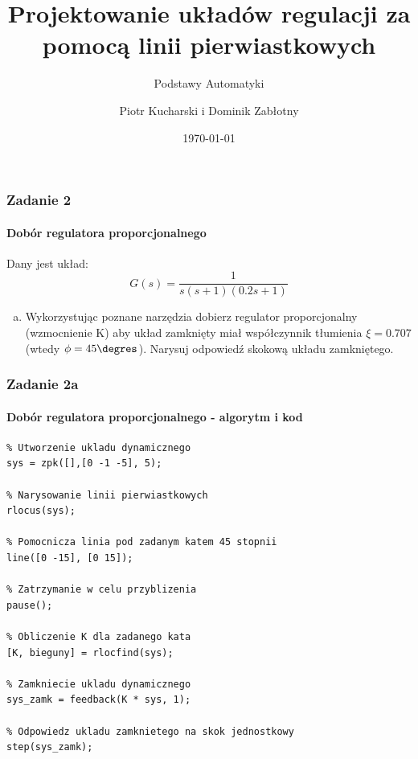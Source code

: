 \documentclass{beamer}
\title{Projektowanie układów regulacji za pomocą linii pierwiastkowych}
\subtitle{Podstawy Automatyki}
\author{Piotr Kucharski i Dominik Zabłotny}
\institute{Wydział Elekrotechniki, Automatyki, Informatyki i Inżynierii Biomedycznej}
\date{\today}
\begin{document}
\titleframe[pl]

\begin{frame}\frametitle{Zadanie 2}\framesubtitle{Dobór regulatora proporcjonalnego}
	Dany jest układ:
	\[
	G(s) = \frac{1}{s(s+1)(0.2s+1)}
	\]
    \begin{enumerate}[a)]
        \item Wykorzystując poznane narzędzia dobierz regulator proporcjonalny (wzmocnienie K) aby układ zamknięty miał współczynnik tłumienia $\xi = 0.707$ (wtedy $\phi = 45\degres$). Narysuj odpowiedź skokową układu zamkniętego.
        
        
    \end{enumerate}
\end{frame}

\begin{frame}[fragile]\frametitle{Zadanie 2a}\framesubtitle{Dobór regulatora proporcjonalnego - algorytm i kod}
	\begin{lstlisting}
% Utworzenie ukladu dynamicznego
sys = zpk([],[0 -1 -5], 5);

% Narysowanie linii pierwiastkowych
rlocus(sys);

% Pomocnicza linia pod zadanym katem 45 stopnii
line([0 -15], [0 15]);           

% Zatrzymanie w celu przyblizenia
pause();                            

% Obliczenie K dla zadanego kata
[K, bieguny] = rlocfind(sys);       

% Zamkniecie ukladu dynamicznego
sys_zamk = feedback(K * sys, 1);    

% Odpowiedz ukladu zamknietego na skok jednostkowy
step(sys_zamk);                     
	\end{lstlisting}
\end{frame}
\end{document}
